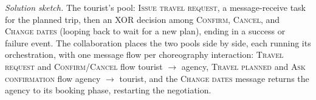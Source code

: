 \textit{Solution sketch.} The tourist's pool: \textsc{Issue travel request}, a message-receive task for the planned trip, then an XOR decision among \textsc{Confirm}, \textsc{Cancel}, and \textsc{Change dates} (looping back to wait for a new plan), ending in a success or failure event. The collaboration places the two pools side by side, each running its orchestration, with one message flow per choreography interaction: \textsc{Travel request} and \textsc{Confirm}/\textsc{Cancel} flow tourist $\to$ agency, \textsc{Travel planned} and \textsc{Ask confirmation} flow agency $\to$ tourist, and the \textsc{Change dates} message returns the agency to its booking phase, restarting the negotiation.
